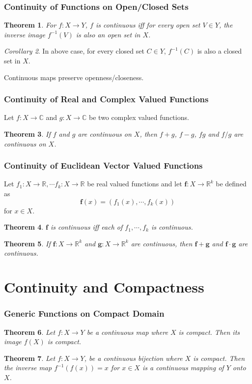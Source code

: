 \documentclass[a4paper,12pt]{report}
\newcommand{\R}{\mathbb{R}}
\newcommand{\C}{\mathbb{C}}
\newcommand{\bm}{\boldsymbol}
\theoremstyle{plain}
\newtheorem{theorem}{\color{blue}Theorem}[chapter] %
\theoremstyle{definition}
\theoremstyle{remark}
\newtheorem{corollary}[theorem]{\color{SkyBlue}Corollary} %
\begin{document}
\subsubsection{Continuity of Functions on Open/Closed Sets}
\begin{theorem}
For $f:X\to Y$, $f$ is continuous \emph{iff} for every open set $V\in Y$, the inverse image $f^{-1}(V)$ is also an open set in $X$.
\end{theorem}
\begin{corollary}
In above case, for every closed set $C\in Y$, $f^{-1}(C)$ is also a closed set in $X$.
\end{corollary}
\begin{insight}
Continuous maps preserve openness/closeness.
\end{insight}
\subsubsection{Continuity of Real and Complex Valued Functions}
Let $f:X\to\C$ and $g:X\to\C$ be two complex valued functions.
\begin{theorem}
If $f$ and $g$ are continuous on $X$, then $f+g$, $f-g$, $fg$ and $f/g$ are continuous on $X$.
\end{theorem}
\subsubsection{Continuity of Euclidean Vector Valued Functions}
Let $f_1:X\to\R,\cdots f_k:X\to\R$ be real valued functions and let $\bm{f}:X\to\R^k$ be defined as \[\bm{f}(x)=\left(f_1(x),\cdots,f_k(x)\right)\] for $x\in X$.
\begin{theorem}
$\bm{f}$ is continuous \emph{iff} each of $f_1,\cdots,f_k$ is continuous.
\end{theorem}
\begin{theorem}
If $\bm{f}:X\to\R^k$ and $\bm{g}:X\to\R^k$ are continuous, then $\bm{f}+\bm{g}$ and $\bm{f}\cdot \bm{g}$ are continuous.
\end{theorem}
\section{Continuity and Compactness}
\subsubsection{Generic Functions on Compact Domain}
\begin{theorem}
Let $f:X\to Y$ be a continuous map where $X$ is compact. Then its image $f(X)$ is compact.
\end{theorem}
\begin{theorem}
Let $f:X\to Y$, be a continuous bijection where $X$ is compact. Then the inverse map $f^{-1}\left(f(x)\right)=x$ for $x\in X$ is a continuous mapping of $Y$ onto $X$.
\end{theorem}
\end{document}
